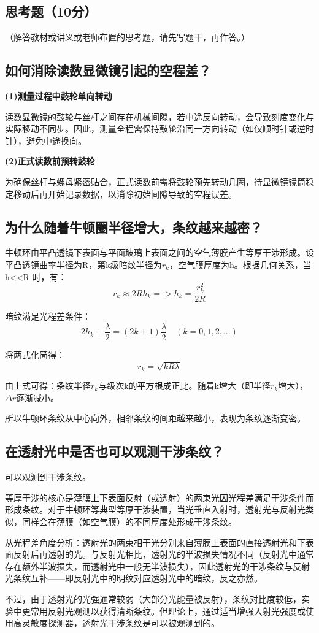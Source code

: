 \documentclass[]{../template/Report}%
\begin{document}
\begin{fullreportonly}
\section{思考题（10分）}
（解答教材或讲义或老师布置的思考题，请先写题干，再作答。）
\subsection{如何消除读数显微镜引起的空程差？}
\textbf{(1)测量过程中鼓轮单向转动}
\par
读数显微镜的鼓轮与丝杆之间存在机械间隙，若中途反向转动，会导致刻度变化与实际移动不同步。因此，测量全程需保持鼓轮沿同一方向转动（如仅顺时针或逆时针），避免中途换向。
\par

\textbf{(2)正式读数前预转鼓轮}
\par
为确保丝杆与螺母紧密贴合，正式读数前需将鼓轮预先转动几圈，待显微镜镜筒稳定移动后再开始记录数据，以消除初始间隙导致的空程误差。

\subsection{为什么随着牛顿圈半径增大，条纹越来越密？}
牛顿环由平凸透镜下表面与平面玻璃上表面之间的空气薄膜产生等厚干涉形成。设平凸透镜曲率半径为R，第k级暗纹半径为$r_k$，空气膜厚度为h。根据几何关系，当 h<<R 时，有：
\[
r_k \approx 2Rh_k  =>  h_k = \frac{r_k^2}{2R}
\]
\par
暗纹满足光程差条件：
\[
2h_k + \frac{\lambda}{2} = (2k+1)\frac{\lambda}{2} \quad (k = 0,1,2,...)
\]
\par
将两式化简得：
\[
r_k = \sqrt{kR\lambda}
\]
\par
由上式可得：条纹半径$r_k$与级次k的平方根成正比。随着k增大（即半径$r_k$增大），$\Delta r$逐渐减小。
\par
所以牛顿环条纹从中心向外，相邻条纹的间距越来越小，表现为条纹逐渐变密。

\subsection{在透射光中是否也可以观测干涉条纹？}
可以观测到干涉条纹。
\par
等厚干涉的核心是薄膜上下表面反射（或透射）的两束光因光程差满足干涉条件而形成条纹。对于牛顿环等典型等厚干涉装置，当光垂直入射时，透射光与反射光类似，同样会在薄膜（如空气膜）的不同厚度处形成干涉条纹。
\par
从光程差角度分析：透射光的两束相干光分别来自薄膜上表面的直接透射光和下表面反射后再透射的光。与反射光相比，透射光的半波损失情况不同（反射光中通常存在额外半波损失，而透射光中一般无半波损失），因此透射光的干涉条纹与反射光条纹互补——即反射光中的明纹对应透射光中的暗纹，反之亦然。
\par
不过，由于透射光的光强通常较弱（大部分光能量被反射），条纹对比度较低，实验中更常用反射光观测以获得清晰条纹。但理论上，通过适当增强入射光强度或使用高灵敏度探测器，透射光干涉条纹是可以被观测到的。

\end{fullreportonly}
\insertnotes
\end{document}
